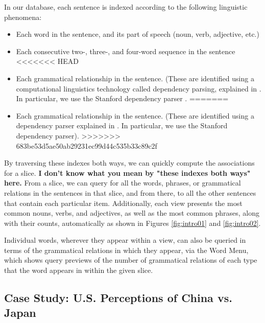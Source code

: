 \documentclass{sig-alternate}
\newcommand{\strong}[1] {\textbf{#1}}
\begin{document}
 In our database, each sentence is indexed according to the following linguistic phenomena:
\begin{itemize}
  \item Each word in the sentence, and its part of speech (noun, verb, adjective, etc.)
  \item Each consecutive two-, three-, and four-word sequence in the sentence
<<<<<<< HEAD
  \item Each grammatical relationship in the sentence. (These are identified using a computational linguistics technology called dependency parsing,  explained in \cite{jurafsky_chapter_2009}. In particular, we use the Stanford dependency parser \cite{klein_accurate_2003}.
=======
  \item Each grammatical relationship in the sentence. (These are identified using a dependency parser  explained in \cite{jurafsky_chapter_2009}. In particular, we use the Stanford dependency parser\cite{klein_accurate_2003}).
>>>>>>> 683be53d5ae50ab29231ec99d44c535b33c89c2f
\end{itemize}

By traversing these indexes both ways, we can quickly compute the associations for a slice. \strong{I don't know what you mean by "these indexes both ways" here.}  From a slice, we can query for all the words, phrases, or grammatical relations in the sentences in that slice, and from there, to all the other sentences that contain each particular item.  Additionally, each view presents the most common nouns, verbs, and adjectives, as well as the most common phrases, along with their counts, automatically as shown in Figures \ref{fig:intro01} and \ref{fig:intro02}.    

Individual words, wherever they appear within a view, can also be queried in terms of the grammatical relations in which they appear, via the Word Menu, which shows query previews of the number of grammatical relations of each type that the word appears in within the given slice.



\subsection{Case Study: U.S. Perceptions of China vs. Japan}
\end{document}
